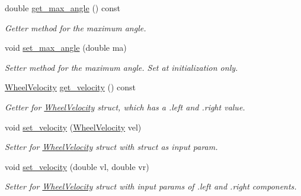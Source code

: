 \begin{DoxyCompactItemize}
double \mbox{\hyperlink{class_motion_handler_af6ef42cdbf31ec1589e14d5dfd639d79}{get\+\_\+max\+\_\+angle}} () const
\begin{DoxyCompactList}\small\item\em Getter method for the maximum angle. \end{DoxyCompactList}\item 
\mbox{\label{class_motion_handler_aa73973c705626f1f95ac59391f23bcc9}} 
void \mbox{\hyperlink{class_motion_handler_aa73973c705626f1f95ac59391f23bcc9}{set\+\_\+max\+\_\+angle}} (double ma)
\begin{DoxyCompactList}\small\item\em Setter method for the maximum angle. Set at initialization only. \end{DoxyCompactList}\item 
\mbox{\label{class_motion_handler_abe03a52474984233d1867405925a4102}} 
\mbox{\hyperlink{struct_wheel_velocity}{Wheel\+Velocity}} \mbox{\hyperlink{class_motion_handler_abe03a52474984233d1867405925a4102}{get\+\_\+velocity}} () const
\begin{DoxyCompactList}\small\item\em Getter for \mbox{\hyperlink{struct_wheel_velocity}{Wheel\+Velocity}} struct, which has a .left and .right value. \end{DoxyCompactList}\item 
\mbox{\label{class_motion_handler_ac4bf67ba783c1afb5a5839229de3f3f9}} 
void \mbox{\hyperlink{class_motion_handler_ac4bf67ba783c1afb5a5839229de3f3f9}{set\+\_\+velocity}} (\mbox{\hyperlink{struct_wheel_velocity}{Wheel\+Velocity}} vel)
\begin{DoxyCompactList}\small\item\em Setter for \mbox{\hyperlink{struct_wheel_velocity}{Wheel\+Velocity}} struct with struct as input param. \end{DoxyCompactList}\item 
\mbox{\label{class_motion_handler_af31975aa667ca20835e4d5bb0216706e}} 
void \mbox{\hyperlink{class_motion_handler_af31975aa667ca20835e4d5bb0216706e}{set\+\_\+velocity}} (double vl, double vr)
\begin{DoxyCompactList}\small\item\em Setter for \mbox{\hyperlink{struct_wheel_velocity}{Wheel\+Velocity}} struct with input params of .left and .right components. \end{DoxyCompactList}\item 

\end{DoxyCompactItemize}
